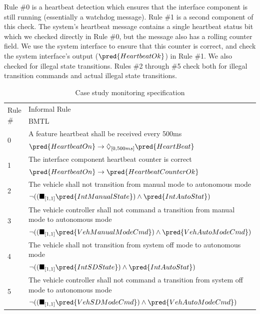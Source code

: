 Rule \#0 is a heartbeat detection which ensures that the interface component is still running (essentially a watchdog message). Rule \#1 is a second component of this check. The system's heartbeat message contains a single heartbeat status bit which we checked directly in Rule \#0, but the message also has a rolling counter field. We use the system interface to ensure that this counter is correct, and check the system interface's output ($\pred{HeartbeatOk}$) in Rule \#1.
We also checked for illegal state transitions. Rules \#2 through \#5 check both for illegal transition commands and actual illegal state transitions.

\begin{table}
\begin{tabular}{|l|p{4.5in}|}
\hline \multirow{2}{*}{Rule \#} & Informal Rule \\ & BMTL \\
\hline \multirow{2}{*}{0} & A feature heartbeat shall be received every 500ms \\
& $\pred{HeartbeatOn} \rightarrow \lozenge_{[0,500ms]} \pred{HeartBeat}$ \\
\hline \multirow{2}{*}{1} & The interface component heartbeat counter is correct \\
& $\pred{HeartbeatOn} \rightarrow \pred{HeartbeatCounterOk}$ \\
\hline \multirow{2}{*}{2} & The vehicle shall not transition from manual mode to autonomous mode \\
&  $\neg ((\blacksquare_{[1,1]} \pred{IntManualState}) \wedge \pred{IntAutoStat})$\\
\hline \multirow{2}{*}{3} & The vehicle controller shall not command a transition from manual mode to autonomous mode \\
& $\neg ((\blacksquare_{[1,1]} \pred{VehManualModeCmd}) \wedge \pred{VehAutoModeCmd})$\\
\hline \multirow{2}{*}{4} & The vehicle shall not transition from system off mode to autonomous mode \\ 
&  $\neg ((\blacksquare_{[1,1]} \pred{IntSDState}) \wedge \pred{IntAutoStat})$\\
\hline \multirow{2}{*}{5} & The vehicle controller shall not command a transition from system off mode to autonomous mode \\
& $\neg ((\blacksquare_{[1,1]} \pred{VehSDModeCmd}) \wedge \pred{VehAutoModeCmd})$\\
\hline
\end{tabular}
\caption{Case study monitoring specification \label{tab:monspec}}
\end{table}

